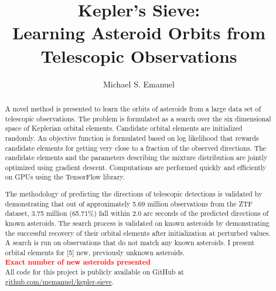 \documentclass[11pt]{gsasthesis} %
\newcommand\todo[1]{\textbf{\textcolor{red}{#1}}}
\begin{document}
\title{Kepler's Sieve: \\Learning Asteroid Orbits from Telescopic Observations} %
\author{Michael S. Emanuel} %





\begin{abstract}
A novel method is presented to learn the orbits of asteroids from a large data set of telescopic observations.
The problem is formulated as a search over the six dimensional space of Keplerian orbital elements.
Candidate orbital elements are initialized randomly.
An objective function is formulated based on log likelihood that rewards candidate elements for getting 
very close to a fraction of the observed directions.
The candidate elements and the parameters describing the mixture distribution are jointly optimized using gradient descent.
Computations are performed quickly and efficiently on GPUs using the TensorFlow library.

The methodology of predicting the directions of telescopic detections is validated by demonstrating 
that out of approximately 5.69 million observations from the ZTF dataset,
3.75 million (65.71\%) fall within 2.0 arc seconds of the predicted directions of known asteroids.
The search process is validated on known asteroids by demonstrating the successful recovery 
of their orbital elements after initialization at perturbed values.
A search is run on observations that do not match any known asteroids.
I present orbital elements for [5] new, previously unknown asteroids.\\
\todo{Exact number of new asteroids presented}\\
All code for this project is publicly available on GitHub at \href{https://github.com/memanuel/kepler-sieve}{github.com/memanuel/kepler-sieve}.

\end{abstract}
\end{document}

